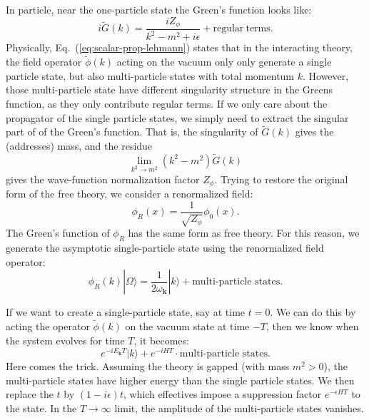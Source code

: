 \documentclass[aps,prb,superscriptaddress,nofootinbib]{revtex4}
\begin{document}
In particle, near the one-particle state the Green's function looks like:
\begin{equation}\label{eq:scalar-prop-lehmann}
	i\tilde G(k) = \frac{iZ_{\phi}}{k^2-m^2+i\epsilon} + \mathrm{regular\ terms}.
\end{equation}
Physically, Eq.~(\ref{eq:scalar-prop-lehmann}) states that in the interacting theory, the field operator $\tilde\phi(k)$ acting on the vacuum only only generate a single particle state, but also multi-particle states with total momentum $k$.
However, those multi-particle state have different singularity structure in the Greens function, as they only contribute regular terms.
If we only care about the propagator of the single particle states, we simply need to extract the singular part of of the Green's function.
That is, the singularity of $\tilde{G}(k)$ gives the (addresses) mass, and the residue 
\begin{equation*}
	\lim_{k^2 \rightarrow m^2} (k^2-m^2)\tilde{G}(k)
\end{equation*}
gives the wave-function normalization factor $Z_\phi$.
Trying to restore the original form of the free theory, we consider a renormalized field:
\begin{equation}
	\phi_R(x) = \frac{1}{\sqrt{Z_\phi}}\phi_0(x).
\end{equation}
The Green's function of $\phi_R$ has the same form as free theory.
For this reason, we generate the asymptotic single-particle state using the renormalized field operator:
\begin{equation}\label{eq:scalar-field-generate-particle}
	\phi_R(k)|\Omega\rangle = \frac{1}{2\omega_{\bm k}}|k\rangle + \text{multi-particle states}.
\end{equation}

If we want to create a single-particle state, say at time $t=0$.
We can do this by acting the operator $\tilde{\phi}(k)$ on the vacuum state at time $-T$, then we know when the system evolves for time $T$, it becomes:
\begin{equation}
	e^{-i E_{\bm k} T}|k\rangle + e^{-iHT} \cdot \text{multi-particle states}.
\end{equation}
Here comes the trick.
Assuming the theory is gapped (with mass $m^2>0$), the multi-particle states have higher energy than the single particle states.
We then replace the $t$ by $(1-i\epsilon)t$, which effectives impose a suppression factor $e^{-\epsilon H T}$ to the state.
In the $T\rightarrow \infty$ limit, the amplitude of the multi-particle states vanishes.
\end{document}
